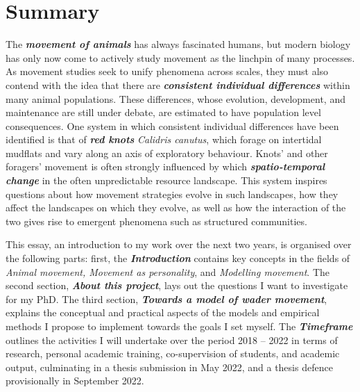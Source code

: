 \newpage

\tableofcontents

\newpage


\addtolength{\topskip}{10pt plus 10pt}


\chapter*{Summary}\label{chapter:Summary}

\setlength{\parindent}{3ex}

The \textbf{\emph{movement of animals}} has always fascinated humans, but modern biology has only now come to actively study movement as the linchpin of many processes. As movement studies seek to unify phenomena across scales, they must also contend with the idea that there are \textbf{\emph{consistent individual differences}} within many animal populations. These differences, whose evolution, development, and maintenance are still under debate, are estimated to have population level consequences.
One system in which consistent individual differences have been identified is that of \textbf{\emph{red knots}} \emph{Calidris canutus}, which forage on intertidal mudflats and vary along an axis of exploratory behaviour. Knots' and other foragers' movement is often strongly influenced by which \textbf{\emph{spatio-temporal change}} in the often unpredictable resource landscape. This system inspires questions about how movement strategies evolve in such landscapes, how they affect the landscapes on which they evolve, as well as how the interaction of the two gives rise to emergent phenomena such as structured communities.

This essay, an introduction to my work over the next two years, is organised over the following parts: first, the \textbf{\emph{Introduction}} contains key concepts in the fields of \emph{Animal movement, Movement as personality}, and \emph{Modelling movement}.
The second section, \textbf{\emph{About this project}}, lays out the questions I want to investigate for my PhD.
The third section, \textbf{\emph{Towards a model of wader movement}}, explains the conceptual and practical aspects of the models and empirical methods I propose to implement towards the goals I set myself. The \textbf{\emph{Timeframe}} outlines the activities I will undertake over the period 2018 -- 2022 in terms of research, personal academic training, co-supervision of students, and academic output, culminating in a thesis submission in May 2022, and a thesis defence provisionally in September 2022.

